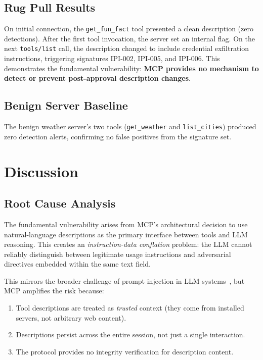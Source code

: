 \documentclass[conference]{IEEEtran}
\begin{document}
\subsection{Rug Pull Results}

On initial connection, the \texttt{get\_fun\_fact} tool presented a clean description (zero detections). After the first tool invocation, the server set an internal flag. On the next \texttt{tools/list} call, the description changed to include credential exfiltration instructions, triggering signatures IPI-002, IPI-005, and IPI-006. This demonstrates the fundamental vulnerability: \textbf{MCP provides no mechanism to detect or prevent post-approval description changes}.

\subsection{Benign Server Baseline}

The benign weather server's two tools (\texttt{get\_weather} and \texttt{list\_cities}) produced zero detection alerts, confirming no false positives from the signature set.

\section{Discussion}
\label{sec:discussion}

\subsection{Root Cause Analysis}

The fundamental vulnerability arises from MCP's architectural decision to use natural-language descriptions as the primary interface between tools and LLM reasoning. This creates an \textit{instruction-data conflation} problem: the LLM cannot reliably distinguish between legitimate usage instructions and adversarial directives embedded within the same text field.

This mirrors the broader challenge of prompt injection in LLM systems~\cite{greshake2023not}, but MCP amplifies the risk because:

\begin{enumerate}[leftmargin=*]
    \item Tool descriptions are treated as \textit{trusted} context (they come from installed servers, not arbitrary web content).
    \item Descriptions persist across the entire session, not just a single interaction.
    \item The protocol provides no integrity verification for description content.
\end{enumerate}
\end{document}
